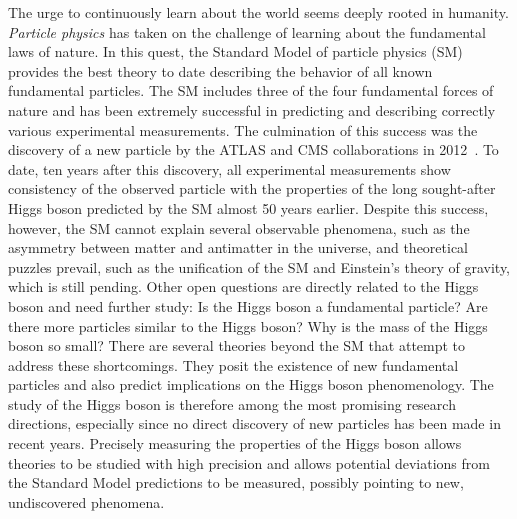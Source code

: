 
The urge to continuously learn about the world seems deeply rooted in humanity.
\emph{Particle physics} has taken on the challenge of learning about the fundamental laws of nature. 
In this quest, the Standard Model of particle physics (SM) provides the best theory to date describing the behavior of all known fundamental particles. 
The SM includes three of the four fundamental forces of nature and has been extremely successful in predicting and describing correctly various experimental measurements. 
The culmination of this success was the discovery of a new particle by the ATLAS and CMS collaborations in 2012~\cite{HIGG-2012-27,CMS-HIG-12-028}.
To date, ten years after this discovery, all experimental measurements show consistency of the observed particle with the properties of the long sought-after Higgs boson predicted by the SM almost 50 years earlier.
Despite this success, however, the SM cannot explain several observable phenomena, such as the asymmetry between matter and antimatter in the universe, and theoretical puzzles prevail, such as the unification of the SM and Einstein's theory of gravity, which is still pending.
Other open questions are directly related to the Higgs boson and need further study: Is the Higgs boson a fundamental particle? Are there more particles similar to the Higgs boson? Why is the mass of the Higgs boson so small? 
There are several theories beyond the SM that attempt to address these shortcomings. 
They posit the existence of new fundamental particles and also predict implications on the Higgs boson phenomenology.
The study of the Higgs boson is therefore among the most promising research directions, especially since no direct discovery of new particles has been made in recent years.
Precisely measuring the properties of the Higgs boson allows theories to be studied with high precision and allows potential deviations from the Standard Model predictions to be measured, possibly pointing to new, undiscovered phenomena. 

